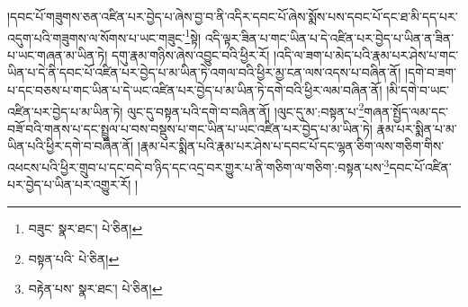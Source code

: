 །དབང་པོ་གཟུགས་ཅན་འཛིན་པར་བྱེད་པ་ཞེས་བྱ་བ་ནི་འདིར་དབང་པོ་ཞེས་སྨོས་པས་དབང་པོ་དང་ཐ་མི་དད་པར་འདུག་པའི་གཟུགས་ལ་སོགས་པ་ཡང་གཟུང་\footnote{བཟུང་  སྣར་ཐང་།  པེ་ཅིན། }སྟེ། འདི་ལྟར་ཟིན་པ་གང་ཡིན་པ་དེ་འཛིན་པར་བྱེད་པ་ཡིན་ན་ཟིན་པ་ཡང་གཞན་མ་ཡིན་ཏེ། དགུ་རྣམ་གཉིས་ཞེས་འབྱུང་བའི་ཕྱིར་རོ། །འདི་ལ་ཟག་པ་མེད་པའི་རྣམ་པར་ཤེས་པ་གང་ཡིན་པ་དེ་ནི་དབང་པོ་འཛིན་པར་བྱེད་པ་མ་ཡིན་ཏེ་འགལ་བའི་ཕྱིར་མྱ་ངན་ལས་འདས་པ་བཞིན་ནོ། །དགེ་བ་ཟག་པ་དང་བཅས་པ་གང་ཡིན་པ་དེ་ཡང་འཛིན་པར་བྱེད་པ་མ་ཡིན་ཏེ་དགེ་བའི་ཕྱིར་ལམ་བཞིན་ནོ། །མི་དགེ་བ་ཡང་འཛིན་པར་བྱེད་པ་མ་ཡིན་ཏེ། ལུང་དུ་བསྟན་པའི་དགེ་བ་བཞིན་ནོ། །ལུང་དུ་མ་:བསྟན་པ་\footnote{བསྟན་པའི་  པེ་ཅིན། }གཞན་སྤྱོད་ལམ་དང་བཟོ་བའི་གནས་པ་དང་སྤྲུལ་པ་བས་བསྡུས་པ་གང་ཡིན་པ་ཡང་འཛིན་པར་བྱེད་པ་མ་ཡིན་ཏེ། རྣམ་པར་སྨིན་པ་མ་ཡིན་པའི་ཕྱིར་དགེ་བ་བཞིན་ནོ། །རྣམ་པར་སྨིན་པའི་རྣམ་པར་ཤེས་པ་དབང་པོ་དང་ལྷན་ཅིག་ལས་གཅིག་གིས་འཕངས་པའི་ཕྱིར་གྲུབ་པ་དང་བདེ་བ་ཉིད་དང་འདྲ་བར་གྱུར་པ་ནི་གཅིག་ལ་གཅིག་:བསྟན་པས་\footnote{བརྟེན་པས་  སྣར་ཐང་།  པེ་ཅིན། }དབང་པོ་འཛིན་པར་བྱེད་པ་ཡིན་པར་འགྱུར་རོ། །
